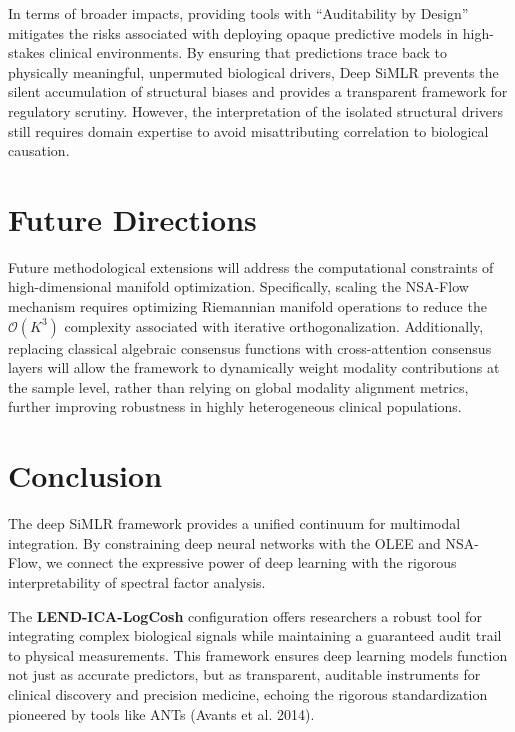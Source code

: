 \documentclass[
  letterpaper,
]{report}
\begin{document}
In terms of broader impacts, providing tools with ``Auditability by
Design'' mitigates the risks associated with deploying opaque predictive
models in high-stakes clinical environments. By ensuring that
predictions trace back to physically meaningful, unpermuted biological
drivers, Deep SiMLR prevents the silent accumulation of structural
biases and provides a transparent framework for regulatory scrutiny.
However, the interpretation of the isolated structural drivers still
requires domain expertise to avoid misattributing correlation to
biological causation.

\section{Future Directions}\label{future-directions}

Future methodological extensions will address the computational
constraints of high-dimensional manifold optimization. Specifically,
scaling the NSA-Flow mechanism requires optimizing Riemannian manifold
operations to reduce the \(\mathcal{O}(K^3)\) complexity associated with
iterative orthogonalization. Additionally, replacing classical algebraic
consensus functions with cross-attention consensus layers will allow the
framework to dynamically weight modality contributions at the sample
level, rather than relying on global modality alignment metrics, further
improving robustness in highly heterogeneous clinical populations.

\section{Conclusion}\label{conclusion}

The deep SiMLR framework provides a unified continuum for multimodal
integration. By constraining deep neural networks with the OLEE and
NSA-Flow, we connect the expressive power of deep learning with the
rigorous interpretability of spectral factor analysis.

The \textbf{LEND-ICA-LogCosh} configuration offers researchers a robust
tool for integrating complex biological signals while maintaining a
guaranteed audit trail to physical measurements. This framework ensures
deep learning models function not just as accurate predictors, but as
transparent, auditable instruments for clinical discovery and precision
medicine, echoing the rigorous standardization pioneered by tools like
ANTs (Avants et al. 2014).

\cleardoublepage
{}
{}
\appendix
\end{document}
